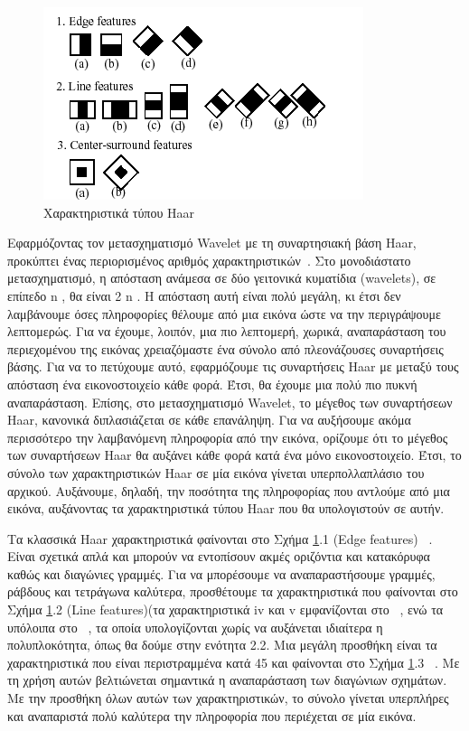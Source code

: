 \begin{figure}[htbp]
  \begin{center}
    \includegraphics[width=0.8\maxwidth]{../figures/haarfeatures.png}
    \caption{Χαρακτηριστικά τύπου Haar\label{fig:hypervisors}}
   \end{center}
\end{figure}


Εφαρμόζοντας τον μετασχηματισμό Wavelet με τη συναρτησιακή βάση Haar, προκύπτει
ένας περιορισμένος αριθμός χαρακτηριστικών~\cite{OrePapSinOsu97}. Στο μονοδιάστατο μετασχηματισμό, η
απόσταση ανάμεσα σε δύο γειτονικά κυματίδια (wavelets), σε επίπεδο n , θα είναι 2 n . Η απόσταση αυτή είναι
πολύ μεγάλη, κι έτσι δεν λαμβάνουμε όσες πληροφορίες θέλουμε από μια εικόνα ώστε να την
περιγράψουμε λεπτομερώς. Για να έχουμε, λοιπόν, μια πιο λεπτομερή, χωρικά, αναπαράσταση του
περιεχομένου της εικόνας χρειαζόμαστε ένα σύνολο από πλεονάζουσες συναρτήσεις βάσης. Για να
το πετύχουμε αυτό, εφαρμόζουμε τις συναρτήσεις Haar με μεταξύ τους απόσταση ένα
εικονοστοιχείο κάθε φορά. Έτσι, θα έχουμε μια πολύ πιο πυκνή αναπαράσταση. Επίσης, στο
μετασχηματισμό Wavelet, το μέγεθος των συναρτήσεων Haar, κανονικά διπλασιάζεται σε κάθε
επανάληψη. Για να αυξήσουμε ακόμα περισσότερο την λαμβανόμενη πληροφορία από την εικόνα,
ορίζουμε ότι το μέγεθος των συναρτήσεων Haar θα αυξάνει κάθε φορά κατά ένα μόνο
εικονοστοιχείο. Έτσι, το σύνολο των χαρακτηριστικών Haar σε μία εικόνα γίνεται
υπερπολλαπλάσιο του αρχικού. Αυξάνουμε, δηλαδή, την ποσότητα της πληροφορίας που αντλούμε
από μια εικόνα, αυξάνοντας τα χαρακτηριστικά τύπου Haar που θα υπολογιστούν σε αυτήν.

Τα κλασσικά Haar χαρακτηριστικά φαίνονται στο Σχήμα \ref{fig:hypervisors}.1 (Edge features) ~\cite{OrePapSinOsu97}.
Είναι σχετικά απλά και μπορούν να εντοπίσουν ακμές οριζόντια και κατακόρυφα καθώς και διαγώνιες γραμμές. Για να
μπορέσουμε να αναπαραστήσουμε γραμμές, ράβδους και τετράγωνα καλύτερα, προσθέτουμε τα
χαρακτηριστικά που φαίνονται στο Σχήμα \ref{fig:hypervisors}.2 (Line features)(τα χαρακτηριστικά iv και v εμφανίζονται στο
~\cite{Viola01rapidobject}, ενώ τα υπόλοιπα στο ~\cite{Lienhart02anextended},
τα οποία υπολογίζονται χωρίς να αυξάνεται ιδιαίτερα η
πολυπλοκότητα, όπως θα δούμε στην ενότητα 2.2. Μια μεγάλη προσθήκη είναι τα χαρακτηριστικά
που είναι περιστραμμένα κατά 45 \degree και φαίνονται στο Σχήμα \ref{fig:hypervisors}.3 ~\cite{Lienhart02anextended}. Με τη χρήση αυτών
βελτιώνεται σημαντικά η αναπαράσταση των διαγώνιων σχημάτων. Με την προσθήκη όλων αυτών
των χαρακτηριστικών, το σύνολο γίνεται υπερπλήρες και αναπαριστά πολύ καλύτερα την
πληροφορία που περιέχεται σε μία εικόνα.

